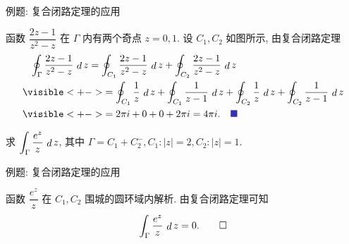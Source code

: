 \begin{frame}{例题: 复合闭路定理的应用}
\begin{solutions}
函数 $\dfrac{2z-1}{z^2-z}$ 在 $\Gamma$ 内有两个奇点 $z=0,1$.
\onslide<+->
设 $C_1,C_2$ 如图所示,
\onslide<+->
由复合闭路定理
\begin{align*}
&\hphantom{=}\oint_\Gamma\frac{2z-1}{z^2-z}\diff z
=\oint_{C_1}\frac{2z-1}{z^2-z}\diff z+\oint_{C_2}\frac{2z-1}{z^2-z}\diff z\\
&\visible<+->{=\oint_{C_1}\frac1z\diff z+\oint_{C_1}\frac1{z-1}\diff z
+\oint_{C_2}\frac1z\diff z+\oint_{C_2}\frac1{z-1}\diff z}\\
&\visible<+->{=2\pi i+0+0+2\pi i=4\pi i.\mqed}
\end{align*}
\end{solutions}

\begin{example}
求 $\displaystyle\int_\Gamma\frac{e^z}z\,\mathop{d} z$, 其中 $\Gamma=C_1+C_2^-,C_1:|z|=2,C_2:|z|=1$.
\end{example}
\end{frame}


\begin{frame}{例题: 复合闭路定理的应用}
\begin{solution}
\begin{center}
\end{center}
\onslide<+->
函数 $\dfrac{e^z}z$ 在 $C_1,C_2$ 围城的圆环域内解析.
\onslide<+->
由复合闭路定理可知 
\[\int_\Gamma\frac{e^z}z\,\mathop{d} z=0.\qedhere\]
\end{solution}
\end{frame}

